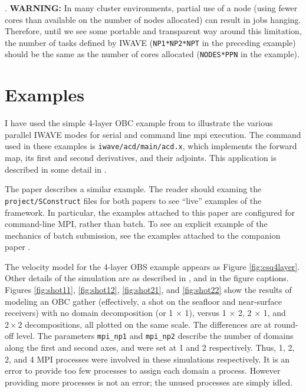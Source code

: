 . {\bf WARNING:} In many cluster environments, partial use of a node (using fewer cores than available on the number of nodes allocated) can result in jobs hanging. Therefore, until we see some portable and transparent way around this limitation, the number of tasks defined by IWAVE ({\tt NP1*NP2*NPT} in the preceding example) should be the same as the number of cores allocated ({\tt NODES*PPN} in the example).

\section{Examples}

I have used the simple 4-layer OBC example from \cite[]{trip14:struct} to illustrate the various parallel IWAVE modes for serial and command line mpi execution. The command used in these examples is {\tt iwave/acd/main/acd.x}, which implements the forward map, its first and second derivatives, and their adjoints. This application is described in some detail in \cite{trip14:struct}. 

The paper \cite[]{SymesIWEXT:15} describes a similar example. The reader should examing the {\tt project/SConstruct} files for both papers to see ``live'' examples of the framework. In particular, the examples attached to this paper are configured for command-line MPI, rather than batch. To see an explicit example of the mechanics of batch submission, see the examples attached to the companion paper \cite[]{SymesIWEXT:15}.

The velocity model for the 4-layer OBS example appears as Figure \ref{fig:csq4layer}. Other details of the simulation are as described in \cite{trip14:struct}, and in the figure captions.
Figures \ref{fig:shot11}, \ref{fig:shot12}, \ref{fig:shot21}, and \ref{fig:shot22} show the results of modeling an OBC gather (effectively, a shot on the seafloor and near-surface receivers) with no domain decomposition (or 1 $\times$ 1), versus 1 $\times$ 2, 2 $\times$ 1, and $2 \times 2$ decompositions, all plotted on the same scale. The differences are at round-off level. The parameters {\tt mpi\_np1} and {\tt mpi\_np2} describe the number of domains along the first and second axes, and were set at 1 and 2 respectively. Thus, 1, 2, 2, and 4 MPI processes were involved in these simulations respectively. It is an error to provide too few processes to assign each domain a process. However providing more processes is not an error; the unused processes are simply idled.

